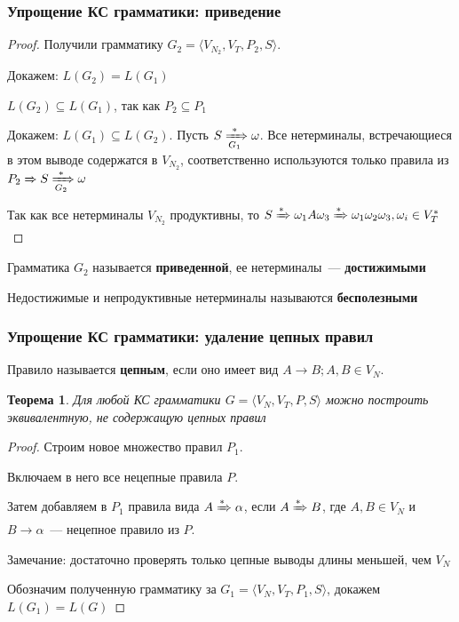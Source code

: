 \documentclass{beamer}
\newtheorem{rutheorem}{Теорема}
\newcommand{\derives}[1][*]{\xRightarrow[]{#1}}
\newcommand{\deriveg}[1]{\xRightarrow[#1]{*}}
\begin{document}
\begin{frame}[fragile]
  \transwipe[direction=90]
  \frametitle{Упрощение КС грамматики: приведение}
   \begin{proof}
   Получили грамматику $G_2 = \langle V_{N_2}, V_T, P_2, S\rangle$.

   Докажем: $L(G_2) = L(G_1)$

   $L(G_2) \subseteq L(G_1)$, так как $P_2 \subseteq P_1$

   Докажем: $L(G_1) \subseteq L(G_2)$. Пусть $S \deriveg{G_1} \omega$. Все нетерминалы, встречающиеся в этом выводе содержатся в $V_{N_2}$, соответственно используются только правила из $ P_2 \derives[] S \deriveg{G_2} \omega $

   Так как все нетерминалы $V_{N_2}$ продуктивны, то  $S \derives \omega_1 A \omega_3 \derives \omega_1 \omega_2 \omega_3, \omega_i \in V_T^*$


   \end{proof}

   Грамматика $G_2$ называется \textbf{приведенной}, ее нетерминалы~--- \textbf{достижимыми}

   Недостижимые и непродуктивные нетерминалы называются \textbf{бесполезными}
\end{frame}

\begin{frame}[fragile]
  \transwipe[direction=90]
  \frametitle{Упрощение КС грамматики: удаление цепных правил}
  Правило называется \textbf{цепным}, если оно имеет вид $A \to B; A, B \in V_N$.

  \begin{rutheorem}
    Для любой КС грамматики $G=\langle V_N, V_T, P, S \rangle$ можно построить эквивалентную, не содержащую цепных правил
  \end{rutheorem}

   \begin{proof}
   Строим новое множество правил $P_1$.

   Включаем в него все нецепные правила  $P$.

   Затем добавляем в $P_1$ правила вида $A \derives \alpha$, если $A \derives B$, где $A, B \in V_N$ и $B \to \alpha$~--- нецепное правило из $P$.

   Замечание: достаточно проверять только цепные выводы длины меньшей, чем $V_N$

   Обозначим полученную грамматику за $G_1=\langle V_N, V_T, P_1, S \rangle$, докажем $L(G_1)=L(G)$
      \end{proof}
\end{frame}
\end{document}
